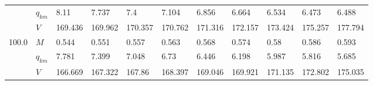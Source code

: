 \begin{tabular}{|l|l|lllllllll|}
      & $q_{km}$ &                      8.11 &                     7.737 &                       7.4 &                     7.104 &                     6.856 &                     6.664 &                     6.534 &    6.473\cellcolor{green} &                     6.488 \\
      & $V$ &                   169.436 &                   169.962 &                   170.357 &                   170.762 &                   171.316 &                   172.157 &                   173.424 &  175.257\cellcolor{green} &                   177.794 \\
\hline
100.0 & $M$ &                     0.544 &                     0.551 &                     0.557 &                     0.563 &                     0.568 &                     0.574 &                      0.58 &                     0.586 &    0.593\cellcolor{green} \\
      & $q_{km}$ &                     7.781 &                     7.399 &                     7.048 &                      6.73 &                     6.446 &                     6.198 &                     5.987 &                     5.816 &    5.685\cellcolor{green} \\
      & $V$ &                   166.669 &                   167.322 &                    167.86 &                   168.397 &                   169.046 &                   169.921 &                   171.135 &                   172.802 &  175.035\cellcolor{green} \\
\hline
\end{tabular}